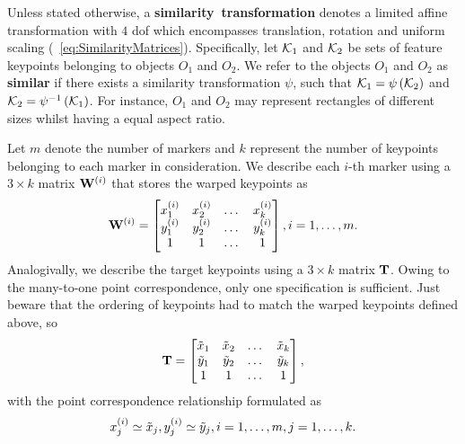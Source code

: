 Unless stated otherwise, a \mbox{\textbf{similarity transformation}} denotes a limited affine transformation with $4$ \gls{dof} which encompasses translation, rotation and uniform scaling (\eqstr{}~\ref{eq:SimilarityMatrices}). Specifically, let $\mathcal{K}_1$ and $\mathcal{K}_2$ be sets of feature keypoints belonging to objects $O_1$ and $O_2$. We refer to the objects $O_1$ and $O_2$ as \mbox{\textbf{similar}} if there exists a similarity transformation $\psi$, such that $\mathcal{K}_1 = {\psi} \left( \mathcal{K}_2 \right)$ and $\mathcal{K}_2 = {\psi^{-1}} \left( \mathcal{K}_1 \right)$. For instance, $O_1$ and $O_2$ may represent rectangles of different sizes whilst having a equal aspect ratio.

Let $m$ denote the number of markers and $k$ represent the number of keypoints belonging to each marker in consideration. We describe each $i$-th marker using a $3 \times k$ matrix ${\mathbf{W}}^{\left( {i} \right)}$ that stores the warped keypoints as
\begin{equation}
    {\mathbf{W}}^{\left( {i} \right)} =
    \begin{bmatrix}
        {x}_{1}^{\left( {i} \right)} & {x}_{2}^{\left( {i} \right)} & \dots & {x}_{k}^{\left( {i} \right)} \\
        {y}_{1}^{\left( {i} \right)} & {y}_{2}^{\left( {i} \right)} & \dots & {y}_{k}^{\left( {i} \right)} \\
        1                         & 1                         & \dots & 1
    \end{bmatrix},
    i = 1, \dots, m.
\end{equation}
Analogivally, we describe the target keypoints using a $3 \times k$ matrix $\mathbf{T}$. Owing to the many-to-one point correspondence, only one specification is sufficient. Just beware that the ordering of keypoints had to match the warped keypoints defined above, so
\begin{equation}
    \mathbf{T} =
    \begin{bmatrix}
        \tilde{x}_1 & \tilde{x}_2 & \dots & \tilde{x}_k \\
        \tilde{y}_1 & \tilde{y}_2 & \dots & \tilde{y}_k \\
        1           & 1           & \dots & 1
    \end{bmatrix},
\end{equation}
with the point correspondence relationship formulated as
\begin{equation}
    {x}_{j}^{\left( {i} \right)} \simeq \tilde{x}_j, {y}_{j}^{\left( {i} \right)} \simeq \tilde{y}_j, i = 1, \dots, m, j = 1, \dots, k.
\end{equation}

